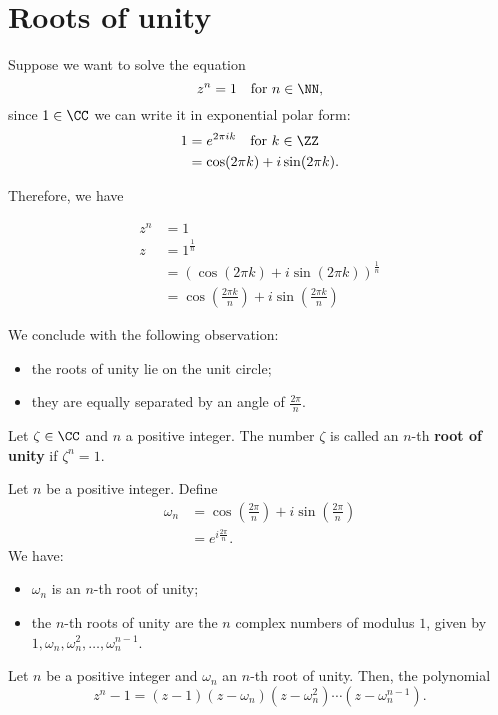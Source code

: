 \documentclass[12pt, a4paper]{article}
\begin{document}
\section{Roots of unity}

Suppose we want to solve the equation 
\[z^n =1 \quad \text{for } n \in \NN,\]
since \(1 \in \CC\) we can write it in exponential polar form:
\[\begin{aligned}
    1 &= e^{2\pi i k} \quad \text{for } k \in \ZZ \\
    &= \cos(2\pi k) +i \sin(2\pi k).
\end{aligned}\]

Therefore, we have 

\[\begin{aligned}
    z^n &= 1 \\
    z &= 1^{\frac{1}{n}} \\
    &= \left( \cos(2\pi k) +i \sin(2\pi k) \right)^{\frac{1}{n}} \\
    &= \cos \left(\frac{2\pi k}{n}\right) +i \sin\left(\frac{2\pi k}{n}\right)
\end{aligned}\]

We conclude with the following observation:
\begin{itemize}
    \item the roots of unity lie on the unit circle;
    \item they are equally separated by an angle of \(\frac{2\pi}{n}\).
\end{itemize}

\begin{definition}
    Let \(\zeta \in \CC\) and \(n\) a positive integer. The number \(\zeta\) is called an \(n\)-th \textbf{root of unity} if \(\zeta^n=1\).
\end{definition}

\begin{mdthm}
    Let \(n\) be a positive integer. Define 
    \[\begin{aligned}
        \omega_n &= \cos \left( \frac{2\pi}{n} \right) + i\sin \left( \frac{2\pi}{n} \right) \\
        &= e^{i \frac{2\pi}{n}}.
    \end{aligned}\]
    We have:
    \begin{itemize}
        \item \(\omega_n\) is an \(n\)-th root of unity;
        \item the \(n\)-th roots of unity are the \(n\) complex numbers of modulus \(1\), given by \(1,\omega_n,\omega_n^2,\ldots, \omega_n^{n-1}\).
    \end{itemize}
\end{mdthm}

\begin{corollary}
    Let \(n\) be a positive integer and \(\omega_n\) an \(n\)-th root of unity. Then, the polynomial 
    \[z^n-1=(z-1)(z-\omega_n)(z-\omega_n^2)\cdots(z-\omega_n^{n-1}).\]
\end{corollary}
\end{document}
